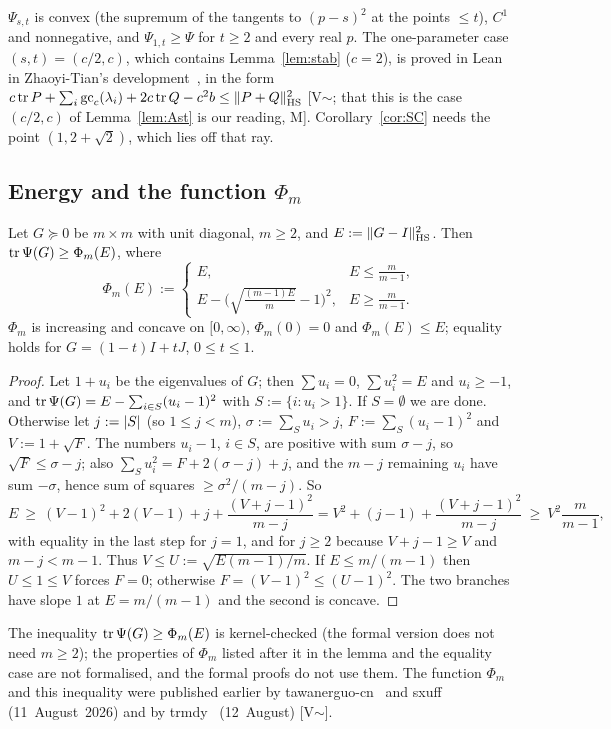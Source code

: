 $\Psi_{s,t}$ is convex (the supremum of the tangents to $(p-s)^2$ at the points $\le t$), $C^1$ and nonnegative, and $\Psi_{1,t}\ge\Psi$ for
$t\ge2$ and every real $p$. The one-parameter case $(s,t)=(c/2,c)$, which contains Lemma~\ref{lem:stab} ($c=2$), is proved in Lean in
Zhaoyi-Tian's development~\cite{ZhaoyiTian}, in the form $c\operatorname{tr} P+\sum_i\mathrm{gc}_c(\lambda_i)+2c\operatorname{tr} Q-c^2b\le\lVert P+Q\rVert_{\mathrm{HS}}^2$ [V$\sim$; that this is the
case $(c/2,c)$ of Lemma~\ref{lem:Ast} is our reading, M]. Corollary~\ref{cor:SC} needs the point $(1,2+\sqrt2)$, which lies off that ray.

\subsection{Energy and the function \texorpdfstring{$\Phi_m$}{Phi\_m}}
\begin{lemma}\label{lem:Phi}
Let $G\succeq0$ be $m\times m$ with unit diagonal, $m\ge2$, and $E:=\lVert G-I\rVert_{\mathrm{HS}}^2$. Then $\operatorname{tr}\Psi(G)\ge\Phi_m(E)$, where
\[
\Phi_m(E):=\begin{cases}E,& E\le\frac{m}{m-1},\\[2pt]
E-\Big(\sqrt{\tfrac{(m-1)E}{m}}-1\Big)^2,& E\ge\frac m{m-1}.\end{cases}
\]
$\Phi_m$ is increasing and concave on $[0,\infty)$, $\Phi_m(0)=0$ and $\Phi_m(E)\le E$; equality holds for $G=(1-t)I+tJ$, $0\le t\le1$.
\end{lemma}

\begin{proof}
Let $1+u_i$ be the eigenvalues of $G$; then $\sum u_i=0$, $\sum u_i^2=E$ and $u_i\ge-1$, and $\operatorname{tr}\Psi(G)=E-\sum_{i\in S}(u_i-1)^2$ with
$S:=\{i:u_i>1\}$. If $S=\emptyset$ we are done. Otherwise let $j:=\lvert S\rvert$ (so $1\le j<m$), $\sigma:=\sum_Su_i>j$, $F:=\sum_S(u_i-1)^2$ and
$V:=1+\sqrt F$. The numbers $u_i-1$, $i\in S$, are positive with sum $\sigma-j$, so $\sqrt F\le\sigma-j$; also $\sum_Su_i^2=F+2(\sigma-j)+j$, and
the $m-j$ remaining $u_i$ have sum $-\sigma$, hence sum of squares $\ge\sigma^2/(m-j)$. So
\[
E\ \ge\ (V-1)^2+2(V-1)+j+\frac{(V+j-1)^2}{m-j}=V^2+(j-1)+\frac{(V+j-1)^2}{m-j}\ \ge\ V^2\frac m{m-1},
\]
with equality in the last step for $j=1$, and for $j\ge2$ because $V+j-1\ge V$ and $m-j<m-1$. Thus $V\le U:=\sqrt{E(m-1)/m}$. If
$E\le m/(m-1)$ then $U\le1\le V$ forces $F=0$; otherwise $F=(V-1)^2\le(U-1)^2$. The two branches have slope $1$ at $E=m/(m-1)$ and the second is
concave.
\end{proof}

The inequality $\operatorname{tr}\Psi(G)\ge\Phi_m(E)$ is kernel-checked (the formal version does not need $m\ge2$); the properties of $\Phi_m$ listed after it
in the lemma and the equality case are not formalised, and the formal proofs do not use them. The function $\Phi_m$ and this inequality
were published earlier by tawanerguo-cn~\cite{TawanRepo} and \mbox{sxuff}~\cite{sxuff} (11~August~2026) and by \mbox{trmdy}~\cite{trmdy}
(12~August) [V$\sim$].

